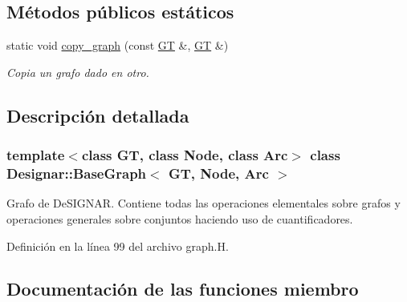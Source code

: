 \subsection*{Métodos públicos estáticos}
\begin{DoxyCompactItemize}
\item 
static void \hyperlink{class_designar_1_1_base_graph_ac34a3b513973c2ed43067934f71ace28}{copy\+\_\+graph} (const \hyperlink{demo-buildgraph_8_c_a3001c40d2c31ca87ed96cd7d1334a55e}{GT} \&, \hyperlink{demo-buildgraph_8_c_a3001c40d2c31ca87ed96cd7d1334a55e}{GT} \&)
\begin{DoxyCompactList}\small\item\em Copia un grafo dado en otro. \end{DoxyCompactList}\end{DoxyCompactItemize}


\subsection{Descripción detallada}
\subsubsection*{template$<$class GT, class Node, class Arc$>$\newline
class Designar\+::\+Base\+Graph$<$ G\+T, Node, Arc $>$}

Grafo de De\+S\+I\+G\+N\+AR. Contiene todas las operaciones elementales sobre grafos y operaciones generales sobre conjuntos haciendo uso de cuantificadores. 

Definición en la línea 99 del archivo graph.\+H.



\subsection{Documentación de las funciones miembro}
\mbox{\label{class_designar_1_1_base_graph_a128e77ef80ed0a40bf307ea06736664b}} 
